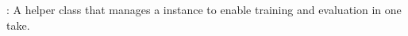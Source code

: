 \markdownRendererDocumentBegin
{}: A helper class that manages a  instance to enable training and evaluation in one take.\markdownRendererDocumentEnd